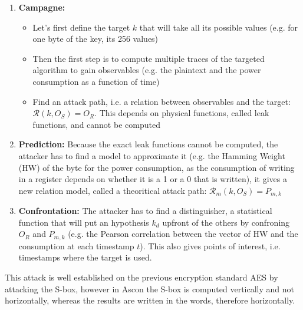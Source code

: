 \documentclass[a4paper,11pt,twocolumn]{article}
\begin{document}
		\begin{enumerate}
			\item \textbf{Campagne:}
			\begin{itemize}
				\item Let's first define the target $k$ that will take all its possible values (e.g. for one byte of the key, its 256 values)
				\item Then the first step is to compute multiple traces of the targeted algorithm to gain observables (e.g. the plaintext and the power consumption as a function of time)
				\item Find an attack path, i.e. a relation between observables and the target: $\mathcal{R}(k,O_S) = O_R$. This depends on physical functions, called leak functions, and cannot be computed
			\end{itemize}
			\item \textbf{Prediction:} Because the exact leak functions cannot be computed, the attacker has to find a model to approximate it (e.g. the Hamming Weight (HW) of the byte for the power consumption, as the consumption of writing in a register depends on whether it is a 1 or a 0 that is written), it gives a new relation model, called a theoritical attack path: $\mathcal{R}_m(k,O_S) = P_{m,k}$
			\item \textbf{Confrontation:} The attacker has to find a distinguisher, a statistical function that will put an hypothesis $k_d$ upfront of the others by confroning $O_R$ and $P_{m,k}$ (e.g. the Pearson correlation between the vector of HW and the consumption at each timestamp $t$). This also gives points of interest, i.e. timestamps where the target is used.
		\end{enumerate}

		This attack is well established on the previous encryption standard AES \cite{aes,cpa_aes} by attacking the S-box, however in Ascon the S-box is computed vertically and not horizontally, whereas the results are written in the words, therefore horizontally.
		
\end{document}

